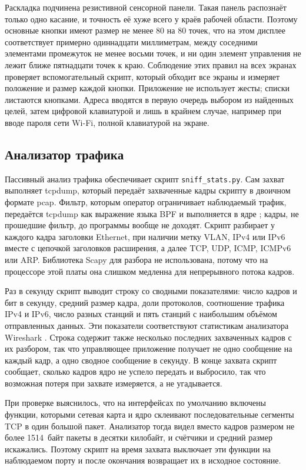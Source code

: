 Раскладка подчинена резистивной сенсорной панели. Такая панель распознаёт только одно касание, и точность её хуже всего у краёв рабочей области. Поэтому основные кнопки имеют размер не менее 80 на 80 точек, что на этом дисплее соответствует примерно одиннадцати миллиметрам, между соседними элементами промежуток не менее восьми точек, и ни один элемент управления не лежит ближе пятнадцати точек к краю. Соблюдение этих правил на всех экранах проверяет вспомогательный скрипт, который обходит все экраны и измеряет положение и размер каждой кнопки. Приложение не использует жесты; списки листаются кнопками. Адреса вводятся в первую очередь выбором из найденных целей, затем цифровой клавиатурой и лишь в крайнем случае, например при вводе пароля сети Wi-Fi, полной клавиатурой на экране.

\subsection{Анализатор трафика}
\label{sec:analyzator}

Пассивный анализ трафика обеспечивает скрипт \texttt{sniff\_stats.py}. Сам захват выполняет tcpdump, который передаёт захваченные кадры скрипту в двоичном формате pcap. Фильтр, которым оператор ограничивает наблюдаемый трафик, передаётся tcpdump как выражение языка BPF и выполняется в ядре \cite{mccanne1993}; кадры, не прошедшие фильтр, до программы вообще не доходят. Скрипт разбирает у каждого кадра заголовки Ethernet, при наличии метку VLAN, IPv4 или IPv6 вместе с цепочкой заголовков расширения, а далее TCP, UDP, ICMP, ICMPv6 или ARP. Библиотека Scapy для разбора не использована, потому что на процессоре этой платы она слишком медленна для непрерывного потока кадров.

Раз в секунду скрипт выводит строку со сводными показателями: число кадров и бит в секунду, средний размер кадра, доли протоколов, соотношение трафика IPv4 и IPv6, число разных станций и пять станций с наибольшим объёмом отправленных данных. Эти показатели соответствуют статистикам анализатора Wireshark \cite{wiresharkstat}. Строка содержит также несколько последних захваченных кадров с их разбором, так что управляющее приложение получает не одно сообщение на каждый кадр, а одно сводное сообщение в секунду. В конце захвата скрипт сообщает, сколько кадров ядро не успело передать и выбросило, так что возможная потеря при захвате измеряется, а не угадывается.

При проверке выяснилось, что на интерфейсах по умолчанию включены функции, которыми сетевая карта и ядро склеивают последовательные сегменты TCP в один большой пакет. Анализатор тогда видел вместо кадров размером не более 1514~байт пакеты в десятки килобайт, и счётчики и средний размер искажались. Поэтому скрипт на время захвата выключает эти функции на наблюдаемом порту и после окончания возвращает их в исходное состояние.

